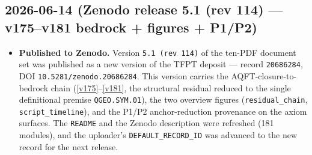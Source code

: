 \subsection*{2026-06-14 (Zenodo release 5.1 (rev 114) --- v175--v181 bedrock + figures + P1/P2)}
\begin{itemize}
\item \textbf{Published to Zenodo.} Version \texttt{5.1 (rev 114)} of the ten-PDF document set was
  published as a new version of the TFPT deposit --- record \texttt{20686284},
  DOI \texttt{10.5281/zenodo.20686284}. This version carries the AQFT-closure-to-bedrock chain
  (\vref{v175}--\vref{v181}, the structural residual reduced to the single definitional premise
  \texttt{QGEO.SYM.01}), the two overview figures (\texttt{residual\_chain}, \texttt{script\_timeline}),
  and the P1/P2 anchor-reduction provenance on the axiom surfaces. The \texttt{README} and the Zenodo
  description were refreshed (181 modules), and the uploader's \texttt{DEFAULT\_RECORD\_ID} was advanced
  to the new record for the next release.
\end{itemize}

